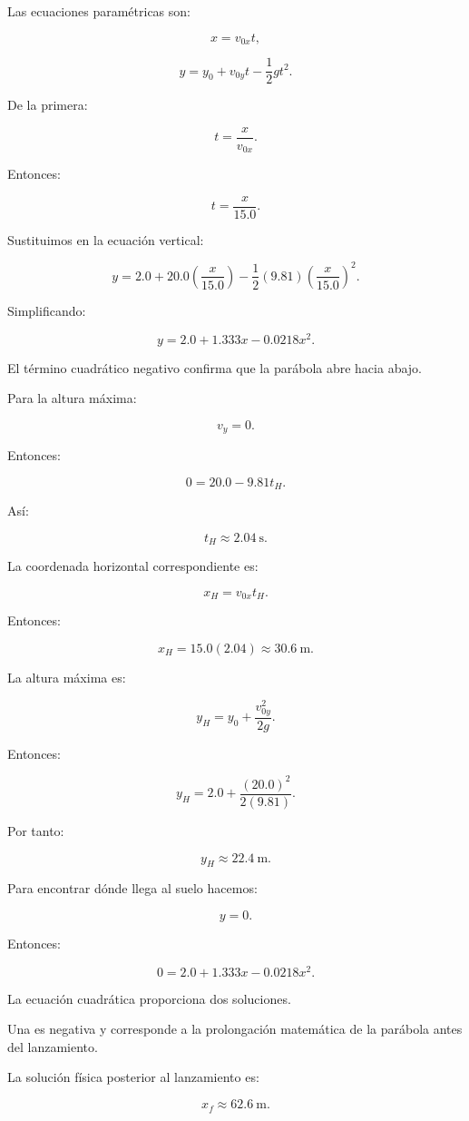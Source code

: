 \begin{explicacion}
Las ecuaciones paramétricas son:

\[
x=v_{0x}t,
\]

\[
y
=
y_0+v_{0y}t-\frac{1}{2}gt^2.
\]

De la primera:

\[
t=\frac{x}{v_{0x}}.
\]

Entonces:

\[
t=\frac{x}{15.0}.
\]

Sustituimos en la ecuación vertical:

\[
y
=
2.0
+
20.0
\left(
\frac{x}{15.0}
\right)
-
\frac{1}{2}(9.81)
\left(
\frac{x}{15.0}
\right)^2.
\]

Simplificando:

\[
\boxed{
y
=
2.0
+
1.333x
-
0.0218x^2
}.
\]

El término cuadrático negativo confirma que la parábola abre hacia abajo.

Para la altura máxima:

\[
v_y=0.
\]

Entonces:

\[
0=20.0-9.81t_H.
\]

Así:

\[
\boxed{
t_H\approx\SI{2.04}{\second}
}.
\]

La coordenada horizontal correspondiente es:

\[
x_H
=
v_{0x}t_H.
\]

Entonces:

\[
x_H
=
15.0(2.04)
\approx
\boxed{\SI{30.6}{\meter}}.
\]

La altura máxima es:

\[
y_H
=
y_0+\frac{v_{0y}^2}{2g}.
\]

Entonces:

\[
y_H
=
2.0
+
\frac{(20.0)^2}{2(9.81)}.
\]

Por tanto:

\[
\boxed{
y_H\approx\SI{22.4}{\meter}
}.
\]

Para encontrar dónde llega al suelo hacemos:

\[
y=0.
\]

Entonces:

\[
0
=
2.0
+
1.333x
-
0.0218x^2.
\]

La ecuación cuadrática proporciona dos soluciones.

Una es negativa y corresponde a la prolongación matemática de la parábola antes
del lanzamiento.

La solución física posterior al lanzamiento es:

\[
\boxed{
x_f\approx\SI{62.6}{\meter}
}.
\]
\end{explicacion}


